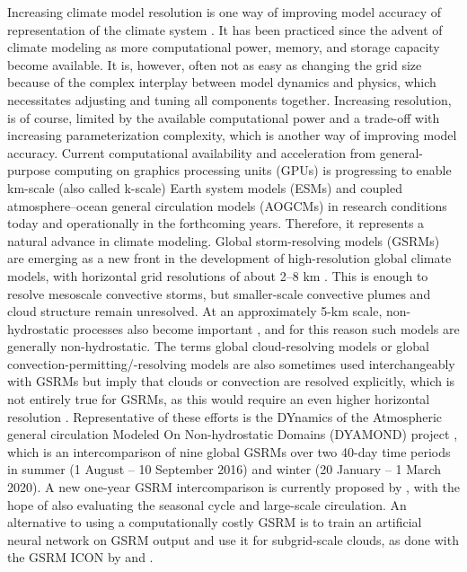 \documentclass[draft]{agujournal2019}
\begin{document}
Increasing climate model resolution is one way of improving model accuracy of representation of the climate system . It has been practiced since the advent of climate modeling as more computational power, memory, and storage capacity become available. It is, however, often not as easy as changing the grid size because of the complex interplay between model dynamics and physics, which necessitates adjusting and tuning all components together. Increasing resolution, is of course, limited by the available computational power and a trade-off with increasing parameterization complexity, which is another way of improving model accuracy. Current computational availability and acceleration from general-purpose computing on graphics processing units (GPUs) is progressing to enable km-scale (also called k-scale) Earth system models (ESMs) and coupled atmosphere--ocean general circulation models (AOGCMs) in research conditions today and operationally in the forthcoming years. Therefore, it represents a natural advance in climate modeling. Global storm-resolving models (GSRMs) are emerging as a new front in the development of high-resolution global climate models, with horizontal grid resolutions of about 2--8 km . This is enough to resolve mesoscale convective storms, but smaller-scale convective plumes and cloud structure remain unresolved. At an approximately 5-km scale, non-hydrostatic processes also become important , and for this reason such models are generally non-hydrostatic. The terms global cloud-resolving models or global convection-permitting/-resolving models are also sometimes used interchangeably with GSRMs but imply that clouds or convection are resolved explicitly, which is not entirely true for GSRMs, as this would require an even higher horizontal resolution . Representative of these efforts is the DYnamics of the Atmospheric general circulation Modeled On Non-hydrostatic Domains (DYAMOND) project , which is an intercomparison of nine global GSRMs over two 40-day time periods in summer (1 August -- 10 September 2016) and winter (20 January -- 1 March 2020). A new one-year GSRM intercomparison is currently proposed by , with the hope of also evaluating the seasonal cycle and large-scale circulation. An alternative to using a computationally costly GSRM is to train an artificial neural network on GSRM output and use it for subgrid-scale clouds, as done with the GSRM ICON by  and .
\end{document}
